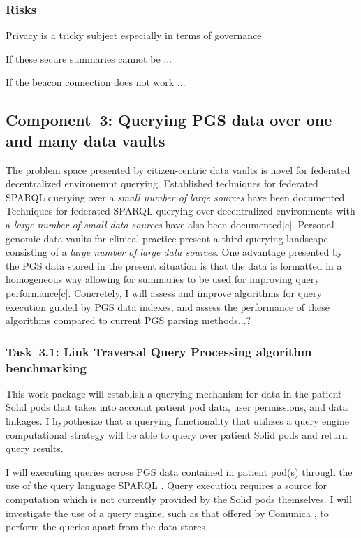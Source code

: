 \documentclass[a4paper,11pt]{article}
\begin{document}
\begin{refsection}
\subsubsection{Risks}
Privacy is a tricky subject especially in terms of governance

If these secure summaries cannot be ...

If the beacon connection does not work ...

\newcommand\WPc{Querying PGS data over one and many data vaults}
\subsection{Component~3: \WPc}

The problem space presented by citizen-centric data vaults is novel for federated decentralized environemnt querying. 
Established techniques for federated SPARQL querying over a \emph{small number of large sources} have been documented~\cite{hibiscus, tpf, sparql_adaptive_anapsid}.
Techniques for federated SPARQL querying over decentralized environments with a \emph{large number of small data sources} have also been documented[c].
Personal genomic data vaults for clinical practice present a third querying landscape consisting of a \emph{large number of large data sources}.
One advantage presented by the PGS data stored in the present situation is that the data is formatted in a homogeneous way allowing for summaries to be used for improving query performance[c].
Concretely, I will assess and improve algorithms for query execution guided by PGS data indexes,
and assess the performance of these algorithms compared to current PGS parsing methods...?

\newcommand\WPca{Link Traversal Query Processing algorithm benchmarking}
\subsubsection{Task~3.1: \WPca}

This work package will establish a querying mechanism for data in the patient Solid pods that takes into account patient pod data, user permissions, and data linkages. 
I hypothesize that a querying functionality that utilizes a query engine computational strategy will be able to query over patient Solid pods and return query results.

I will executing queries across PGS data contained in patient pod(s) through the use of the query language SPARQL \cite{noauthor_sparql_nodate}.
Query execution requires a source for computation which is not currently provided by the Solid pods themselves.
I will investigate the use of a query engine, such as that offered by Comunica \cite{comunica}, to perform the queries apart from the data stores.


\end{refsection}
\end{document}
